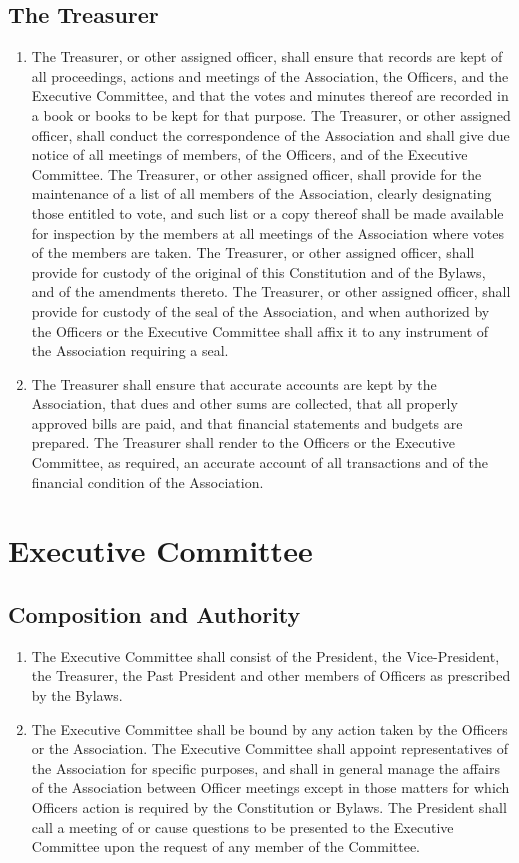 \subsection{The Treasurer}
\begin{enumerate}
	\item The Treasurer, or other assigned officer, shall ensure that records are kept of all proceedings, actions and meetings of the Association, the Officers, and the Executive Committee, and that the votes and minutes thereof are recorded in a book or books to be kept for that purpose. The Treasurer, or other assigned officer, shall conduct the correspondence of the Association and shall give due notice of all meetings of members, of the Officers, and of the Executive Committee. The Treasurer, or other assigned officer, shall provide for the maintenance of a list of all members of the Association, clearly designating those entitled to vote, and such list or a copy thereof shall be made available for inspection by the members at all meetings of the Association where votes of the members are taken. The Treasurer, or other assigned officer, shall provide for custody of the original of this Constitution and of the Bylaws, and of the amendments thereto. The Treasurer, or other assigned officer, shall provide for custody of the seal of the Association, and when authorized by the Officers or the Executive Committee shall affix it to any instrument of the Association requiring a seal.
	\item The Treasurer shall ensure that accurate accounts are kept by the Association, that dues and other sums are collected, that all properly approved bills are paid, and that financial statements and budgets are prepared. The Treasurer shall render to the Officers or the Executive Committee, as required, an accurate account of all transactions and of the financial condition of the Association.
\end{enumerate}

\section{Executive Committee}

\subsection{Composition and Authority}
\begin{enumerate}
	\item The Executive Committee shall consist of the President, the Vice-President, the Treasurer, the Past President and other members of Officers as prescribed by the Bylaws.
	\item The Executive Committee shall be bound by any action taken by the Officers or the Association. The Executive Committee shall appoint representatives of the Association for specific purposes, and shall in general manage the affairs of the Association between Officer meetings except in those matters for which Officers action is required by the Constitution or Bylaws. The President shall call a meeting of or cause questions to be presented to the Executive Committee upon the request of any member of the Committee.
\end{enumerate}


